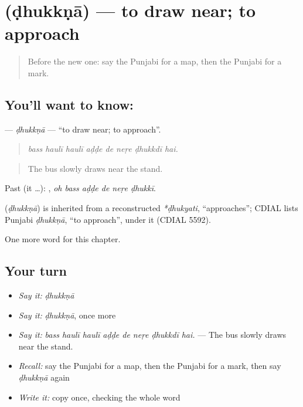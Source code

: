 \section[\texorpdfstring{\pa{ਢੁੱਕਣਾ} (ḍhukkṇā)}{ਢੁੱਕਣਾ (ḍhukkṇā)}]{ (ḍhukkṇā) — to draw near; to approach}

\label{lesson:PA-C269-dhukkna}



\begin{quote}
Before the new one: say the Punjabi for a map, then the Punjabi for a mark.
\end{quote}

\subsection*{You'll want to know: }
\textbf{} — \emph{ḍhukkṇā} — \textquotedblleft{}to draw near; to approach\textquotedblright{}.

\begin{quote}
       
\end{quote}

\begin{quote}
\emph{bass haulī haulī aḍḍe de neṛe ḍhukkdī hai.}
\end{quote}

\begin{quote}
The bus slowly draws near the stand.
\end{quote}

Past (it …):      , \emph{oh bass aḍḍe de neṛe ḍhukkī}.

\begin{cousinweb}
\textbf{} (\emph{ḍhukkṇā}) is inherited from a reconstructed \emph{*ḍhukyati}, \textquotedblleft{}approaches\textquotedblright{}; CDIAL lists Punjabi \emph{ḍhukkṇā}, \textquotedblleft{}to approach\textquotedblright{}, under it (CDIAL 5592).
\end{cousinweb}

\begin{grammarlens}[title={What you've built}]
One more word for this chapter.
\end{grammarlens}

\subsection*{Your turn}
\begin{itemize}
\raggedright
  \item \emph{Say it:} \emph{ḍhukkṇā}
  \item \emph{Say it:} \emph{ḍhukkṇā}, once more
  \item \emph{Say it:} \emph{bass haulī haulī aḍḍe de neṛe ḍhukkdī hai.} — The bus slowly draws near the stand.
  \item \emph{Recall:} say the Punjabi for a map, then the Punjabi for a mark, then say \emph{ḍhukkṇā} again
  \item \emph{Write it:} copy \textbf{} once, checking the whole word
\end{itemize}

